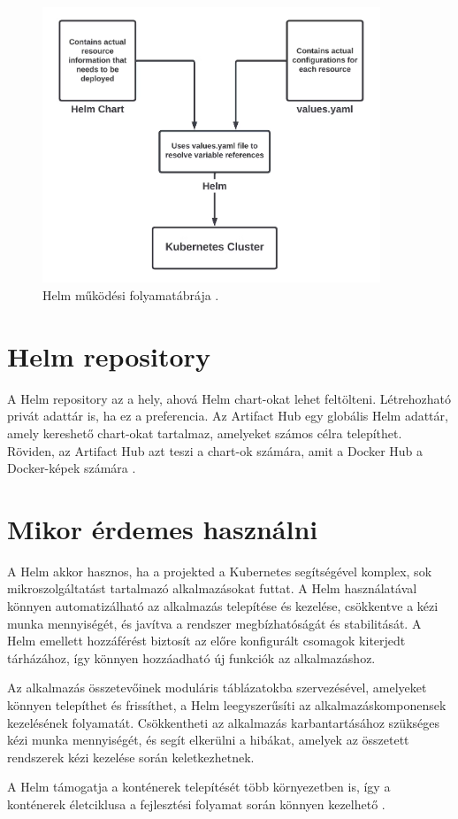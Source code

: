 \begin{figure}[ht]
    \centering
         \includegraphics[width=0.9\textwidth]{figures/helm/helm-overview.png}
          \caption{Helm működési folyamatábrája \cite{helm}.}
           \label{helm-overview}
\end{figure}

\section{Helm repository}
A Helm repository az a hely, ahová Helm chart-okat lehet feltölteni.
Létrehozható privát adattár is, ha ez a preferencia.
Az Artifact Hub egy globális Helm adattár, amely kereshető chart-okat tartalmaz, amelyeket számos célra telepíthet.
Röviden, az Artifact Hub azt teszi a chart-ok számára, amit a Docker Hub a Docker-képek számára \cite{helm}.

\newpage

\section{Mikor érdemes használni}
A Helm akkor hasznos, ha a projekted a Kubernetes segítségével komplex, sok mikroszolgáltatást tartalmazó alkalmazásokat futtat.
A Helm használatával könnyen automatizálható az alkalmazás telepítése és kezelése, csökkentve a kézi munka mennyiségét, és javítva a rendszer megbízhatóságát és stabilitását.
A Helm emellett hozzáférést biztosít az előre konfigurált csomagok kiterjedt tárházához, így könnyen hozzáadható új funkciók az alkalmazáshoz.

Az alkalmazás összetevőinek moduláris táblázatokba szervezésével, amelyeket könnyen telepíthet és frissíthet, a Helm leegyszerűsíti az alkalmazáskomponensek kezelésének folyamatát.
Csökkentheti az alkalmazás karbantartásához szükséges kézi munka mennyiségét, és segít elkerülni a hibákat, amelyek az összetett rendszerek kézi kezelése során keletkezhetnek.

A Helm támogatja a konténerek telepítését több környezetben is, így a konténerek életciklusa a fejlesztési folyamat során könnyen kezelhető \cite{helm}.